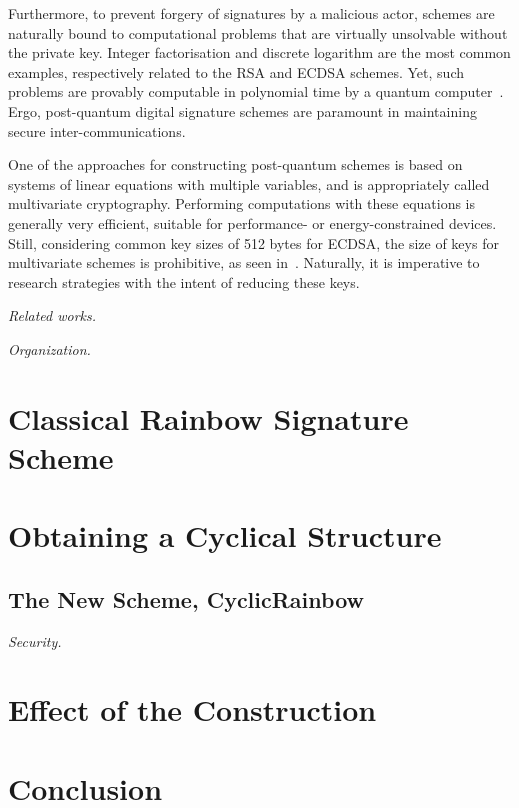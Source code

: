 \documentclass[a4paper, 14pt]{extarticle}
\begin{document}
Furthermore, to prevent forgery of signatures by a malicious actor, schemes are naturally bound to computational problems that are virtually unsolvable without the private key. Integer factorisation and discrete logarithm are the most common examples, respectively related to the RSA and ECDSA schemes. Yet, such problems are provably computable in polynomial time by a quantum computer~\cite{Shor:article:1997:oct}. Ergo, post-quantum digital signature schemes are paramount in maintaining secure inter-communications.

One of the approaches for constructing post-quantum schemes is based on systems of linear equations with multiple variables, and is appropriately called multivariate cryptography. Performing computations with these equations is generally very efficient, suitable for performance- or energy-constrained devices. Still, considering common key sizes of 512 bytes for ECDSA, the size of keys for multivariate schemes is prohibitive, as seen in~\cite[Table 6.4]{Petzoldt:phd:2013:jul}. Naturally, it is imperative to research strategies with the intent of reducing these keys.

\emph{Related works.}

\emph{Organization.}

\section{Classical Rainbow Signature Scheme}

\section{Obtaining a Cyclical Structure}

\subsection{The New Scheme, CyclicRainbow}

\emph{Security.}

\section{Effect of the Construction}

\section{Conclusion}


{\small
}
\end{document}
